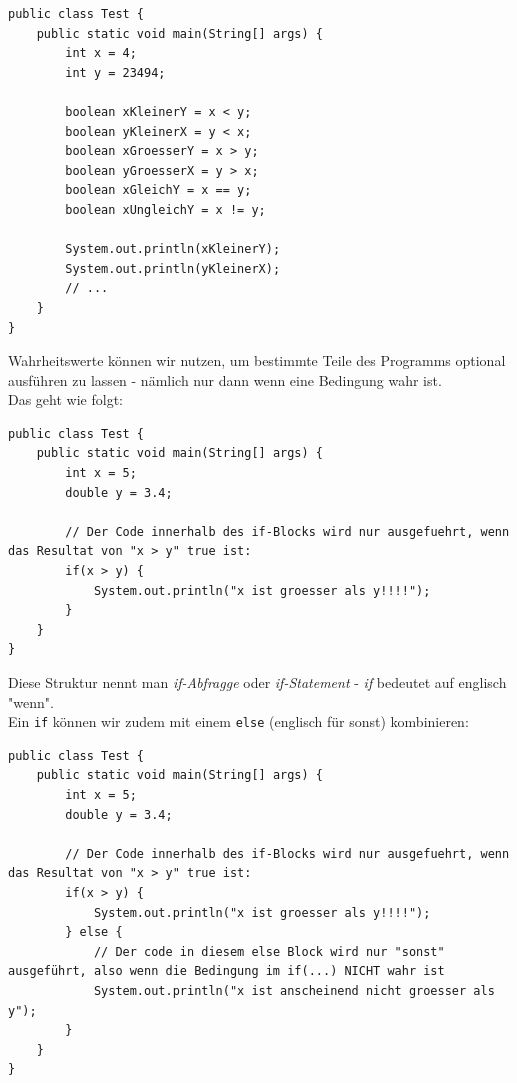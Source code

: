 \documentclass[ngerman,11pt]{article}
\begin{document}
    \begin{lstlisting}[caption=Wahrheitswerte]
public class Test {
    public static void main(String[] args) {
        int x = 4;
        int y = 23494;

        boolean xKleinerY = x < y;
        boolean yKleinerX = y < x;
        boolean xGroesserY = x > y;
        boolean yGroesserX = y > x;
        boolean xGleichY = x == y;
        boolean xUngleichY = x != y;

        System.out.println(xKleinerY);
        System.out.println(yKleinerX);
        // ...
    }
}
    \end{lstlisting}


    Wahrheitswerte können wir nutzen, um bestimmte Teile des Programms optional ausführen zu lassen - nämlich
    nur dann wenn eine Bedingung wahr ist. \\

    Das geht wie folgt:

    \begin{lstlisting}[caption=Variable]
public class Test {
    public static void main(String[] args) {
        int x = 5;
        double y = 3.4;

        // Der Code innerhalb des if-Blocks wird nur ausgefuehrt, wenn das Resultat von "x > y" true ist:
        if(x > y) {
            System.out.println("x ist groesser als y!!!!");
        }
    }
}
    \end{lstlisting}

    Diese Struktur nennt man \textit{if-Abfragge} oder \textit{if-Statement} - \textit{if} bedeutet auf englisch "wenn". \\

    Ein \lstinline{if} können wir zudem mit einem \lstinline{else} (englisch für sonst) kombinieren:

    \begin{lstlisting}[caption=Variable]
public class Test {
    public static void main(String[] args) {
        int x = 5;
        double y = 3.4;

        // Der Code innerhalb des if-Blocks wird nur ausgefuehrt, wenn das Resultat von "x > y" true ist:
        if(x > y) {
            System.out.println("x ist groesser als y!!!!");
        } else {
            // Der code in diesem else Block wird nur "sonst" ausgeführt, also wenn die Bedingung im if(...) NICHT wahr ist
            System.out.println("x ist anscheinend nicht groesser als y");
        }
    }
}
    \end{lstlisting}
\end{document}
